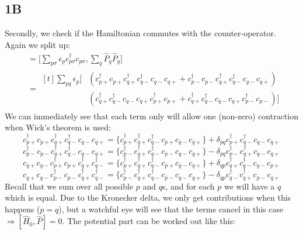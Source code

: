 \documentclass[norsk,a4paper,12pt]{article}
\begin{document}
\subsection*{1B}
Secondly, we check if the Hamiltonian commutes with the counter-operator. Again we split up:
\begin{align*}
[\hat{H}_0, \hat{P}]&=\Big[\sum_{p\sigma}\epsilon_pc_{p\sigma}^{\dagger}c_{p\sigma},\sum_q\hat{P}_q\hat{P}_q\Big]\\
&= \begin{aligned}[t]
\sum_{pq}\epsilon_p\Big[&(c_{p+}^{\dagger}c_{p+}c_{q+}^{\dagger}c_{q-}^{\dagger}c_{q-}c_{q+}
+c_{p-}^{\dagger}c_{p-}c_{q+}^{\dagger}c_{q-}^{\dagger}c_{q-}c_{q+})\\
&(c_{q+}^{\dagger}c_{q-}^{\dagger}c_{q-}c_{q+}c_{p+}^{\dagger}c_{p+}
+c_{q+}^{\dagger}c_{q-}^{\dagger}c_{q-}c_{q+}c_{p-}^{\dagger}c_{p-})\Big]
\end{aligned}
\end{align*}
We can immediately see that each term only will allow one (non-zero) contraction when Wick's theorem is used:
\begin{equation*}
c_{p+}^{\dagger}c_{p+}c_{q+}^{\dagger}c_{q-}^{\dagger}c_{q-}c_{q+}=\{c_{p+}^{\dagger}c_{q+}^{\dagger}c_{q-}^{\dagger}c_{p+}c_{q-}c_{q+}\}+\delta_{pq}c_{p+}^{\dagger}c_{q-}^{\dagger}c_{q-}c_{q+}
\end{equation*}
\begin{equation*}
c_{p-}^{\dagger}c_{p-}c_{q+}^{\dagger}c_{q-}^{\dagger}c_{q-}c_{q+}=\{c_{p-}^{\dagger}c_{q+}^{\dagger}c_{q-}^{\dagger}c_{p-}c_{q-}c_{q+}\}-\delta_{pq}c_{p-}^{\dagger}c_{q+}^{\dagger}c_{q-}c_{q+}
\end{equation*}
\begin{equation*}
c_{q+}c_{q-}c_{p+}^{\dagger}c_{p+}c_{q+}^{\dagger}c_{q-}^{\dagger}=\{c_{p+}^{\dagger}c_{q+}^{\dagger}c_{q-}^{\dagger}c_{p+}c_{q-}c_{q+}\}+\delta_{qp}c_{q+}^{\dagger}c_{q-}^{\dagger}c_{q-}c_{p+}
\end{equation*}
\begin{equation*}
c_{q+}c_{q-}c_{p-}^{\dagger}c_{p-}c_{q+}^{\dagger}c_{q-}^{\dagger}=\{c_{p-}^{\dagger}c_{q+}^{\dagger}c_{q-}^{\dagger}c_{p-}c_{q-}c_{q+}\}-\delta_{qp}c_{q-}^{\dagger}c_{q+}^{\dagger}c_{p-}c_{q+}
\end{equation*}
Recall that we sum over all possible $p$ and $q$s, and for each $p$ we will have a $q$ which is equal. Due to the Kronecker delta, we only get contributions when this happens ($p=q$), but a watchful eye will see that the terms cancel in this case $\Rightarrow [\hat{H}_0,\hat{P}]=0$. The potential part can be worked out like this:
\end{document}
